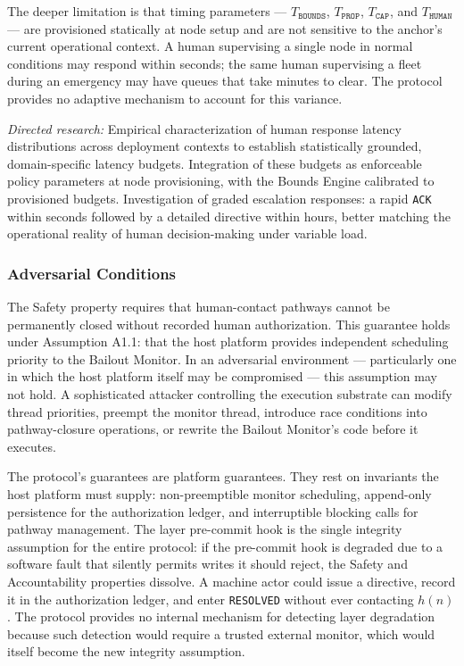 The deeper limitation is that timing parameters --- $T_{\texttt{BOUNDS}}$, $T_{\texttt{PROP}}$, $T_{\texttt{CAP}}$, and $T_{\texttt{HUMAN}}$ --- are provisioned statically at node setup and are not sensitive to the anchor's current operational context. A human supervising a single node in normal conditions may respond within seconds; the same human supervising a fleet during an emergency may have queues that take minutes to clear. The protocol provides no adaptive mechanism to account for this variance.

\textit{Directed research:} Empirical characterization of human response latency distributions across deployment contexts to establish statistically grounded, domain-specific latency budgets. Integration of these budgets as enforceable policy parameters at node provisioning, with the Bounds Engine calibrated to provisioned budgets. Investigation of graded escalation responses: a rapid \texttt{ACK} within seconds followed by a detailed directive within hours, better matching the operational reality of human decision-making under variable load.

\subsubsection{Adversarial Conditions}
\label{sec:adversarial-conditions}

The Safety property requires that human-contact pathways cannot be permanently closed without recorded human authorization. This guarantee holds under Assumption A1.1: that the host platform provides independent scheduling priority to the Bailout Monitor. In an adversarial environment --- particularly one in which the host platform itself may be compromised --- this assumption may not hold. A sophisticated attacker controlling the execution substrate can modify thread priorities, preempt the monitor thread, introduce race conditions into pathway-closure operations, or rewrite the Bailout Monitor's code before it executes.

The protocol's guarantees are platform guarantees. They rest on invariants the host platform must supply: non-preemptible monitor scheduling, append-only persistence for the authorization ledger, and interruptible blocking calls for pathway management. The \fact{} layer pre-commit hook is the single integrity assumption for the entire protocol: if the pre-commit hook is degraded due to a software fault that silently permits writes it should reject, the Safety and Accountability properties dissolve. A machine actor could issue a directive, record it in the authorization ledger, and enter \texttt{RESOLVED} without ever contacting $h(n)$. The protocol provides no internal mechanism for detecting \fact{} layer degradation because such detection would require a trusted external monitor, which would itself become the new integrity assumption.

